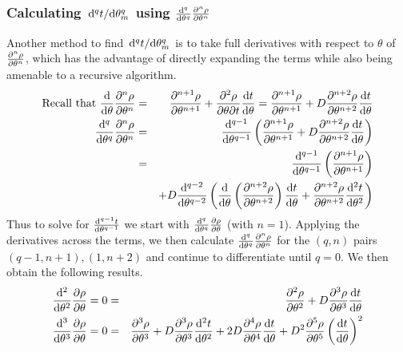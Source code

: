\documentclass[11pt]{article} %
\begin{document}
\subsubsection{Calculating $ \dv*[q]{t}{\theta_m} $ using $ \dv[q]{ }{\theta} \pdv[n]{\rho}{\theta} $}
Another method to find $ \dv*[q]{t}{\theta_m} $ is to take full derivatives with respect to $ \theta $ of $ \pdv[n]{\rho}{\theta} $, which has the advantage of directly expanding the terms while also being amenable to a recursive algorithm.
\begin{eqnarray}
	\mbox{Recall that } \dv{}{\theta} \pdv[n]{\rho}{\theta} & = & \pdv[n+1]{\rho}{\theta} + \pdv[n]{\rho}{\theta}{t}\dv{t}{\theta} = \pdv[n+1]{\rho}{\theta} + D \pdv[n+2]{\rho}{\theta} \dv{t}{\theta} \\
	\dv[q]{ }{\theta} \pdv[n]{\rho}{\theta} & = & \dv[q-1]{ }{\theta} \left(  \pdv[n+1]{\rho}{\theta}  + D \pdv[n+2]{\rho}{\theta} \dv{t}{\theta}  \right) \\
	& = & \dv[q-1]{ }{\theta} \left(  \pdv[n+1]{\rho}{\theta} \right)\\
    &   &  + D \dv[q-2]{  }{\theta} \left( \dv{}{\theta} \left( \pdv[n+2]{\rho}{\theta} \right) \dv{t}{\theta} +  \pdv[n+2]{\rho}{\theta} \dv[2]{t}{\theta}  \right) 
\end{eqnarray}
Thus to solve for $ \dv[q-1]{t}{\theta} $ we start with $ \dv[q]{ }{\theta} \pdv{\rho}{\theta} $ (with $ n = 1 $). Applying the derivatives across the terms, we then calculate $ \dv[q]{ }{\theta} \pdv[n]{\rho}{\theta} $ for the $ (q,n) $ pairs $ (q-1,n+1), (1,n+2) $ and continue to differentiate until $ q = 0 $. We then obtain the following results.
\begin{eqnarray}
	\dv[2]{ }{\theta} \pdv{\rho}{\theta} = 
    0 & = & \pdv[2]{\rho}{\theta}  + D \pdv[3]{\rho}{\theta} \dv{t}{\theta} \\
	\dv[3]{ }{\theta} \pdv{\rho}{\theta} = 
	0 & = & \pdv[3]{\rho}{\theta}  + D \pdv[3]{\rho}{\theta} \dv[2]{t}{\theta}  + 2 D \pdv[4]{\rho}{\theta} \dv{t}{\theta}  + D^2 \pdv[5]{\rho}{\theta} \left(\dv{t}{\theta}\right)^2
\end{eqnarray}
\end{document}
